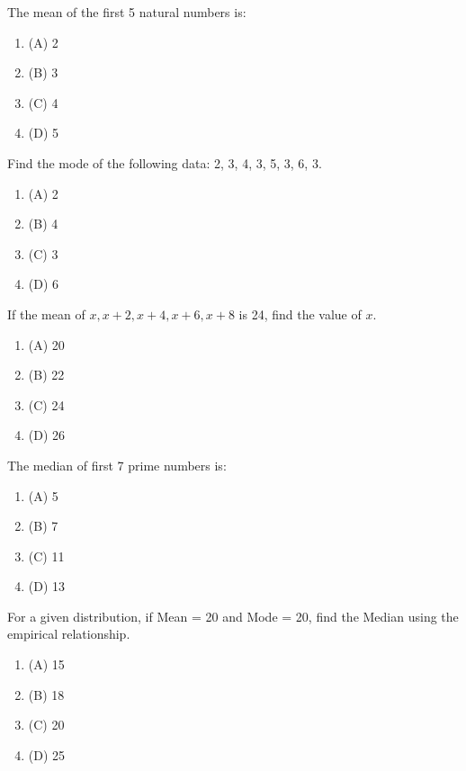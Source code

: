 \documentclass[12pt,a4paper]{exam}
\begin{document}
\begin{questions}
\question[1] The mean of the first 5 natural numbers is:
\begin{enumerate}[label=(\Alph*)]
  \item (A) 2
  \item (B) 3
  \item (C) 4
  \item (D) 5
\end{enumerate}
\vspace{0.15cm}

\question[1] Find the mode of the following data: 2, 3, 4, 3, 5, 3, 6, 3.
\begin{enumerate}[label=(\Alph*)]
  \item (A) 2
  \item (B) 4
  \item (C) 3
  \item (D) 6
\end{enumerate}
\vspace{0.15cm}

\question[1] If the mean of $x, x+2, x+4, x+6, x+8$ is 24, find the value of $x$.
\begin{enumerate}[label=(\Alph*)]
  \item (A) 20
  \item (B) 22
  \item (C) 24
  \item (D) 26
\end{enumerate}
\vspace{0.15cm}

\question[1] The median of first 7 prime numbers is:
\begin{enumerate}[label=(\Alph*)]
  \item (A) 5
  \item (B) 7
  \item (C) 11
  \item (D) 13
\end{enumerate}
\vspace{0.15cm}

\question[1] For a given distribution, if Mean = 20 and Mode = 20, find the Median using the empirical relationship.
\begin{enumerate}[label=(\Alph*)]
  \item (A) 15
  \item (B) 18
  \item (C) 20
  \item (D) 25
\end{enumerate}
\vspace{0.15cm}


\end{questions}
\end{document}
